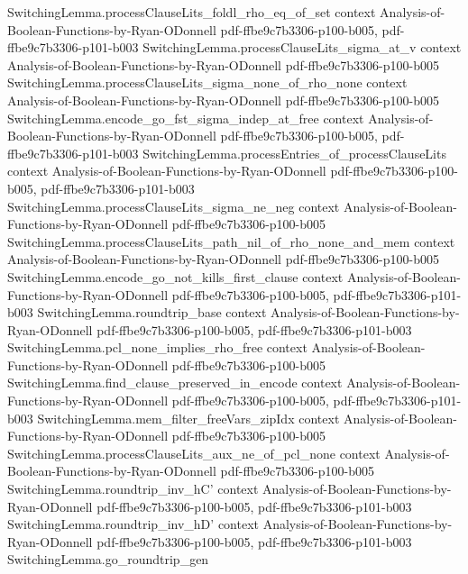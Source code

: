 \begin{lemma}
\proofstep
  {SwitchingLemma.processClauseLits_foldl_rho_eq_of_set}
  {context}
  {Analysis-of-Boolean-Functions-by-Ryan-ODonnell}
  {pdf-ffbe9c7b3306-p100-b005,
    pdf-ffbe9c7b3306-p101-b003}
\proofstep
  {SwitchingLemma.processClauseLits_sigma_at_v}
  {context}
  {Analysis-of-Boolean-Functions-by-Ryan-ODonnell}
  {pdf-ffbe9c7b3306-p100-b005}
\proofstep
  {SwitchingLemma.processClauseLits_sigma_none_of_rho_none}
  {context}
  {Analysis-of-Boolean-Functions-by-Ryan-ODonnell}
  {pdf-ffbe9c7b3306-p100-b005}
\proofstep
  {SwitchingLemma.encode_go_fst_sigma_indep_at_free}
  {context}
  {Analysis-of-Boolean-Functions-by-Ryan-ODonnell}
  {pdf-ffbe9c7b3306-p100-b005,
    pdf-ffbe9c7b3306-p101-b003}
\proofstep
  {SwitchingLemma.processEntries_of_processClauseLits}
  {context}
  {Analysis-of-Boolean-Functions-by-Ryan-ODonnell}
  {pdf-ffbe9c7b3306-p100-b005,
    pdf-ffbe9c7b3306-p101-b003}
\proofstep
  {SwitchingLemma.processClauseLits_sigma_ne_neg}
  {context}
  {Analysis-of-Boolean-Functions-by-Ryan-ODonnell}
  {pdf-ffbe9c7b3306-p100-b005}
\proofstep
  {SwitchingLemma.processClauseLits_path_nil_of_rho_none_and_mem}
  {context}
  {Analysis-of-Boolean-Functions-by-Ryan-ODonnell}
  {pdf-ffbe9c7b3306-p100-b005}
\proofstep
  {SwitchingLemma.encode_go_not_kills_first_clause}
  {context}
  {Analysis-of-Boolean-Functions-by-Ryan-ODonnell}
  {pdf-ffbe9c7b3306-p100-b005,
    pdf-ffbe9c7b3306-p101-b003}
\proofstep
  {SwitchingLemma.roundtrip_base}
  {context}
  {Analysis-of-Boolean-Functions-by-Ryan-ODonnell}
  {pdf-ffbe9c7b3306-p100-b005,
    pdf-ffbe9c7b3306-p101-b003}
\proofstep
  {SwitchingLemma.pcl_none_implies_rho_free}
  {context}
  {Analysis-of-Boolean-Functions-by-Ryan-ODonnell}
  {pdf-ffbe9c7b3306-p100-b005}
\proofstep
  {SwitchingLemma.find_clause_preserved_in_encode}
  {context}
  {Analysis-of-Boolean-Functions-by-Ryan-ODonnell}
  {pdf-ffbe9c7b3306-p100-b005,
    pdf-ffbe9c7b3306-p101-b003}
\proofstep
  {SwitchingLemma.mem_filter_freeVars_zipIdx}
  {context}
  {Analysis-of-Boolean-Functions-by-Ryan-ODonnell}
  {pdf-ffbe9c7b3306-p100-b005}
\proofstep
  {SwitchingLemma.processClauseLits_aux_ne_of_pcl_none}
  {context}
  {Analysis-of-Boolean-Functions-by-Ryan-ODonnell}
  {pdf-ffbe9c7b3306-p100-b005}
\proofstep
  {SwitchingLemma.roundtrip_inv_hC'}
  {context}
  {Analysis-of-Boolean-Functions-by-Ryan-ODonnell}
  {pdf-ffbe9c7b3306-p100-b005,
    pdf-ffbe9c7b3306-p101-b003}
\proofstep
  {SwitchingLemma.roundtrip_inv_hD'}
  {context}
  {Analysis-of-Boolean-Functions-by-Ryan-ODonnell}
  {pdf-ffbe9c7b3306-p100-b005,
    pdf-ffbe9c7b3306-p101-b003}
\proofstep
  {SwitchingLemma.go_roundtrip_gen}

\end{lemma}

